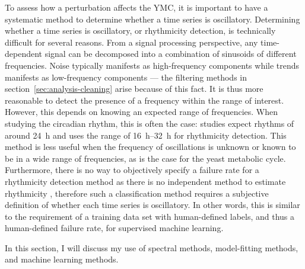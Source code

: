 To assess how a perturbation affects the YMC, it is important to have a systematic method to determine whether a time series is oscillatory.
Determining whether a time series is oscillatory, or rhythmicity detection, is technically difficult for several reasons.
From a signal processing perspective, any time-dependent signal can be decomposed into a combination of sinusoids of different frequencies.
Noise typically manifests as high-frequency components while trends manifests as low-frequency components --- the filtering methods in section~\ref{sec:analysis-cleaning} arise because of this fact.
It is thus more reasonable to detect the presence of a frequency within the range of interest.
However, this depends on knowing an expected range of frequencies.
When studying the circadian rhythm, this is often the case: studies expect rhythms of around \SI{24}{\hour} and \textcite{zielinskiStrengthsLimitationsPeriod2014} uses the range of \SIrange{16}{32}{\hour} for rhythmicity detection.
This method is less useful when the frequency of oscillations is unknown or known to be in a wide range of frequencies, as is the case for the yeast metabolic cycle.
Furthermore, there is no way to objectively specify a failure rate for a rhythmicity detection method as there is no independent method to estimate rhythmicity \parencite{zielinskiStrengthsLimitationsPeriod2014}, therefore such a classification method requires a subjective definition of whether each time series is oscillatory.
In other words, this is similar to the requirement of a training data set with human-defined labels, and thus a human-defined failure rate, for supervised machine learning.

In this section, I will discuss my use of spectral methods, model-fitting methods, and machine learning methods.



